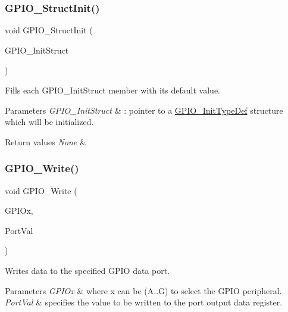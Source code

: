 \subsubsection{\texorpdfstring{GPIO\_StructInit()}{GPIO\_StructInit()}}
{\footnotesize\ttfamily void G\+P\+I\+O\+\_\+\+Struct\+Init (\begin{DoxyParamCaption}\item[{\mbox{\hyperlink{struct_g_p_i_o___init_type_def}{G\+P\+I\+O\+\_\+\+Init\+Type\+Def}} $\ast$}]{G\+P\+I\+O\+\_\+\+Init\+Struct }\end{DoxyParamCaption})}



Fills each G\+P\+I\+O\+\_\+\+Init\+Struct member with its default value. 


\begin{DoxyParams}{Parameters}
{\em G\+P\+I\+O\+\_\+\+Init\+Struct} & \+: pointer to a \mbox{\hyperlink{struct_g_p_i_o___init_type_def}{G\+P\+I\+O\+\_\+\+Init\+Type\+Def}} structure which will be initialized. \\
\hline
\end{DoxyParams}

\begin{DoxyRetVals}{Return values}
{\em None} & \\
\hline
\end{DoxyRetVals}
\mbox{\label{group___g_p_i_o___exported___functions_gaa925f19c8547a00c7a0c269a84873bf9}} 
\subsubsection{\texorpdfstring{GPIO\_Write()}{GPIO\_Write()}}
{\footnotesize\ttfamily void G\+P\+I\+O\+\_\+\+Write (\begin{DoxyParamCaption}\item[{\mbox{\hyperlink{struct_g_p_i_o___type_def}{G\+P\+I\+O\+\_\+\+Type\+Def}} $\ast$}]{G\+P\+I\+Ox,  }\item[{uint16\+\_\+t}]{Port\+Val }\end{DoxyParamCaption})}



Writes data to the specified G\+P\+IO data port. 


\begin{DoxyParams}{Parameters}
{\em G\+P\+I\+Ox} & where x can be (A..G) to select the G\+P\+IO peripheral. \\
\hline
{\em Port\+Val} & specifies the value to be written to the port output data register. \\
\hline
\end{DoxyParams}

